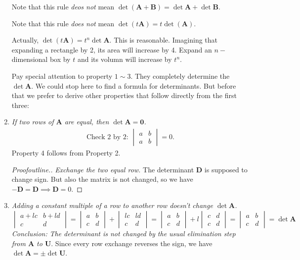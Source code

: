 \begin{enumerate}
Note that this rule \emph{deos not} mean $\det (\bm A+\bm B)=\det \bm A+\det\bm B$.

Note that this rule \emph{does not} mean $\det(t\bm A)=t\det(\bm A)$.

Actually, $\det(t\bm A)=t^n\det \bm A$. This is reasonable. Imagining that expanding a rectangle by 2, its area will increase by 4. Expand an $n-$dimensional box by $t$ and its volumn will increase by $t^n$.

Pay special attention to property $1\sim 3$. They completely determine the $\det\bm A$. We could stop here to find a formula for determinants. But before that we prefer to derive other properties that follow directly from the first three:
\item
\emph{If two rows of $\bm A$ are equal, then $\det\bm A=\bm0$.}
\begin{gather*}
\text{Check 2 by 2:   }\begin{vmatrix}a&b\\a&b\end{vmatrix}
=0.
\end{gather*}
Property 4 follows from Property 2.
\begin{proof}[Proofoutline.]
\textit{Exchange the two equal row.} The determinant $\bm D$ is supposed to change sign. But also the matrix is not changed, so we have $-\bm D=\bm D\implies\bm D=0$.
\end{proof}
\item
\emph{Adding a constant multiple of a row to another row doesn't change $\det\bm A$.}
\[
\begin{vmatrix}a+lc&b+ld\\c&d\end{vmatrix}=
\begin{vmatrix}a&b\\c&d\end{vmatrix}+\begin{vmatrix}lc&ld\\c&d\end{vmatrix}=\begin{vmatrix}a&b\\c&d\end{vmatrix}+l\begin{vmatrix}c&d\\c&d\end{vmatrix}=
\begin{vmatrix}a&b\\c&d\end{vmatrix}=\det\bm A
\]
\emph{Conclusion: }\textit{The determinant is not changed by the usual elimination step from $\bm A$ to $\bm U$}. Since every row exchange reverses the sign, we have $\det\bm A=\pm\det\bm U$.

\end{enumerate}
